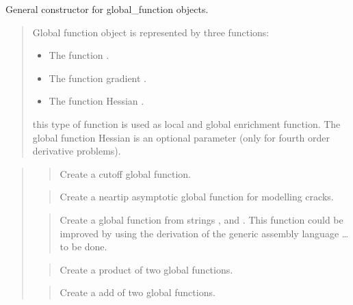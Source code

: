\documentclass[a4paper,11pt,english]{sphinxmanual}
\begin{document}

General constructor for global\_function objects.
\begin{quote}

Global function object is represented by three functions:
\begin{itemize}
\item {} 
The function .

\item {} 
The function gradient .

\item {} 
The function Hessian .

\end{itemize}

this type of function is used as local and global enrichment function. The
global function Hessian is an optional parameter (only for fourth order
derivative problems).
\end{quote}

\begin{quote}

\begin{quote}

Create a cutoff global function.
\end{quote}

\begin{quote}

Create a near\sphinxhyphen{}tip asymptotic global function for modelling cracks.
\end{quote}

\begin{quote}

Create a global function from strings ,  and .
This function could be improved by using the derivation of the generic
assembly language … to be done.
\end{quote}

\begin{quote}

Create a product of two global functions.
\end{quote}

\begin{quote}

Create a add of two global functions.
\end{quote}
\end{quote}
\end{document}
